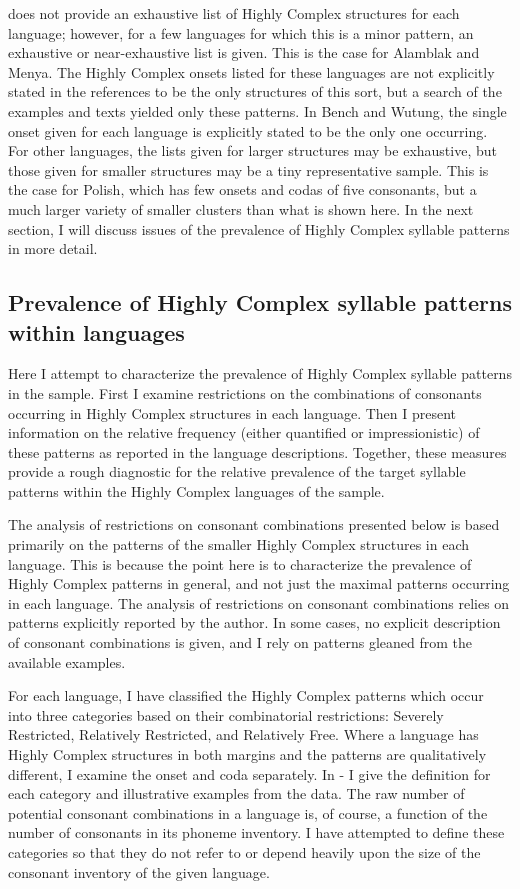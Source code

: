    does not provide an exhaustive list of Highly Complex structures for each language; however, for a few languages for which this is a minor pattern, an exhaustive or near-exhaustive list is given. This is the case for Alamblak and Menya. The Highly Complex onsets listed for these languages are not explicitly stated in the references to be the only structures of this sort, but a search of the examples and texts yielded only these patterns. In Bench and Wutung, the single onset given for each language is explicitly stated to be the only one occurring. For other languages, the lists given for larger structures may be exhaustive, but those given for smaller structures may be a tiny representative sample. This is the case for Polish, which has few onsets and codas of five consonants, but a much larger variety of smaller clusters than what is shown here. In the next section, I will discuss issues of the prevalence of Highly Complex syllable patterns in more detail.

\subsection{Prevalence of Highly Complex syllable patterns within languages}\label{sec:3.4.2}

  Here I attempt to characterize the prevalence of Highly Complex syllable patterns in the sample. First I examine restrictions on the combinations of consonants occurring in Highly Complex structures in each language. Then I present information on the relative frequency (either quantified or impressionistic) of these patterns as reported in the language descriptions. Together, these measures provide a rough diagnostic for the relative prevalence of the target syllable patterns within the Highly Complex languages of the sample.

  The analysis of restrictions on consonant combinations presented below is based primarily on the patterns of the smaller Highly Complex structures in each language. This is because the point here is to characterize the prevalence of Highly Complex patterns in general, and not just the maximal patterns occurring in each language. The analysis of restrictions on consonant combinations relies on patterns explicitly reported by the author. In some cases, no explicit description of consonant combinations is given, and I rely on patterns gleaned from the available examples. 

  For each language, I have classified the Highly Complex patterns which occur into three categories based on their combinatorial restrictions: Severely Restricted, Relatively Restricted, and Relatively Free. Where a language has Highly Complex structures in both margins and the patterns are qualitatively different, I examine the onset and coda separately. In - I give the definition for each category and illustrative examples from the data. The raw number of potential consonant combinations in a language is, of course, a function of the number of consonants in its phoneme inventory. I have attempted to define these categories so that they do not refer to or depend heavily upon the size of the consonant inventory of the given language.

